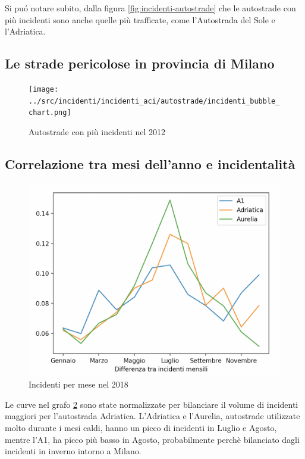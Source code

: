 \documentclass[a4paper]{report}
\begin{document}
Si pu\'o notare subito, dalla figura \ref{fig:incidenti-autostrade} che le autostrade con 
più incidenti sono anche quelle più trafficate, come l'Autostrada del Sole e l'Adriatica.




\subsection{Le strade pericolose in provincia di Milano}

\begin{figure}
    \texttt{[image: ../src/incidenti/incidenti\_aci/autostrade/incidenti\_bubble\_chart.png]}
    \caption{Autostrade con più incidenti nel 2012}
    \label{fig:bubble-incidenti-milano}
\end{figure}




\subsection{Correlazione tra mesi dell'anno e incidentalità}
\begin{figure}
    \includegraphics[width=\linewidth]{../src/incidenti/incidenti_aci/autostrade/mesi_autostrade.png}
    \caption{Incidenti per mese nel 2018}
    \label{fig:incidenti-per-mese}
\end{figure}

Le curve nel grafo \ref{fig:incidenti-per-mese} sono state normalizzate per bilanciare il volume di incidenti maggiori per 
l'autostrada Adriatica.
L'Adriatica e l'Aurelia, autostrade utilizzate molto durante i mesi caldi, hanno un picco di 
incidenti in Luglio e Agosto, mentre l'A1, ha picco più basso in Agosto, probabilmente 
perchè bilanciato dagli incidenti in inverno intorno a Milano.
\end{document}
